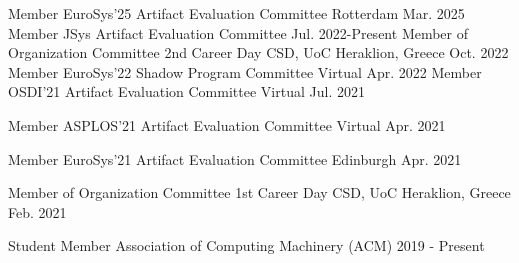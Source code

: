\begin{cvhonors}
	\cvhonor
	{Member} %
	{EuroSys'25 Artifact Evaluation Committee} %
	{Rotterdam} %
	{Mar. 2025} %
	\cvhonor
	{Member} %
	{JSys Artifact Evaluation Committee} %
	{} %
	{Jul. 2022-Present} %
	\cvhonor
	{Member of Organization Committee} %
	{2nd Career Day CSD, UoC} %
	{Heraklion, Greece} %
	{Oct. 2022} %
	\cvhonor
	{Member} %
	{EuroSys'22 Shadow Program Committee} %
	{Virtual} %
	{Apr. 2022} %
	\cvhonor
	{Member} %
	{OSDI'21 Artifact Evaluation Committee} %
	{Virtual} %
	{Jul. 2021} %

	\cvhonor
	{Member} %
	{ASPLOS'21 Artifact Evaluation Committee} %
	{Virtual} %
	{Apr. 2021} %


	\cvhonor
	{Member} %
	{EuroSys'21 Artifact Evaluation Committee} %
	{Edinburgh} %
	{Apr. 2021} %

	\cvhonor
	{Member of Organization Committee} %
	{1st Career Day CSD, UoC} %
	{Heraklion, Greece} %
	{Feb. 2021} %

	\cvhonor
	{Student Member} %
	{Association of Computing Machinery (ACM)} %
	{} %
	{2019 - Present} %


\end{cvhonors}
